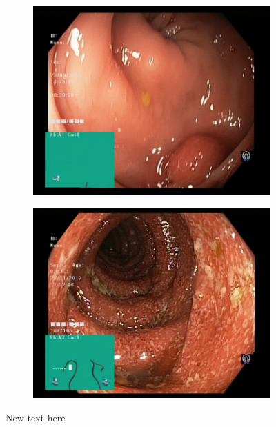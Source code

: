 \begin{figure}[t]
\begin{subfigure}[b]{0.4\textwidth}
            \caption[Hate to be this guy]%
            {{\small }}    
            \label{fig:polypGAN}
        \end{subfigure}
        \qquad\vfill%
        \begin{subfigure}[b]{0.4\textwidth}   
            \centering 
            \includegraphics[width=\textwidth]{experiments/images/polyps.jpg}
            \caption[]%
            {{\small }}    
            \label{fig:zAE}
        \end{subfigure}
        \qquad%
        \begin{subfigure}[b]{0.4\textwidth}   
            \centering 
            \includegraphics[width=\textwidth]{experiments/images/ulcerative-colitis.jpg}
            \caption[]%
            {{\small }}    
            \label{fig:zGAN}
        \end{subfigure}
        \caption[ ]
        {\small New text here} 
        \label{fig:GC1GREEN}
    \end{figure}
    
